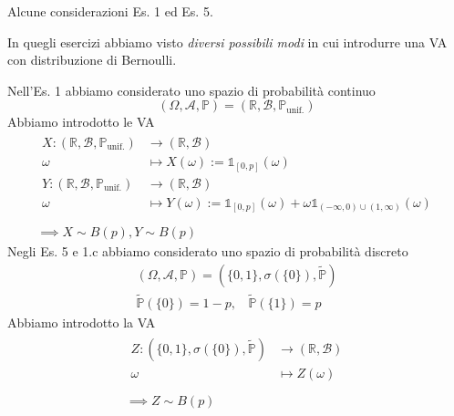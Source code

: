 \begin{oss}
Alcune considerazioni Es. 1 ed Es. 5.

In quegli esercizi abbiamo visto \textit{diversi possibili modi} in cui introdurre una VA con distribuzione di Bernoulli.

Nell'Es. 1 abbiamo considerato uno spazio di probabilità continuo
\begin{equation*}
( \Omega ,\mathcal{A} ,\mathbb{P}) =(\mathbb{R} ,\mathcal{B} ,\mathbb{P}_{\text{unif.}})
\end{equation*}
Abbiamo introdotto le VA
\begin{gather*}
\begin{aligned}
X:(\mathbb{R} ,\mathcal{B} ,\mathbb{P}_{\text{unif.}}) & \rightarrow (\mathbb{R} ,\mathcal{B})\\
\omega  & \mapsto X( \omega ) :=\mathbb{1}_{[ 0,p]}( \omega )\\
Y:(\mathbb{R} ,\mathcal{B} ,\mathbb{P}_{\text{unif.}}) & \rightarrow (\mathbb{R} ,\mathcal{B})\\
\omega  & \mapsto Y( \omega ) :=\mathbb{1}_{[ 0,p]}( \omega ) +\omega \mathbb{1}_{( -\infty ,0) \cup ( 1,\infty )}( \omega )
\end{aligned}\\
\ \\
\implies X\sim B( p) ,Y\sim B( p)
\end{gather*}
Negli Es. 5 e 1.c abbiamo considerato uno spazio di probabilità discreto
\begin{gather*}
( \Omega ,\mathcal{A} ,\mathbb{P}) =\left(\{0,1\} ,\sigma (\{0\}) ,\tilde{\mathbb{P}}\right)\\
\tilde{\mathbb{P}}(\{0\}) =1-p,\ \ \ \ \tilde{\mathbb{P}}(\{1\}) =p
\end{gather*}
Abbiamo introdotto la VA
\begin{gather*}
\begin{aligned}
Z:\left(\{0,1\} ,\sigma (\{0\}) ,\tilde{\mathbb{P}}\right) & \rightarrow (\mathbb{R} ,\mathcal{B})\\
\omega  & \mapsto Z( \omega )
\end{aligned}\\
\\
\implies Z\sim B( p)
\end{gather*}
\end{oss}
\subsubsection{}

